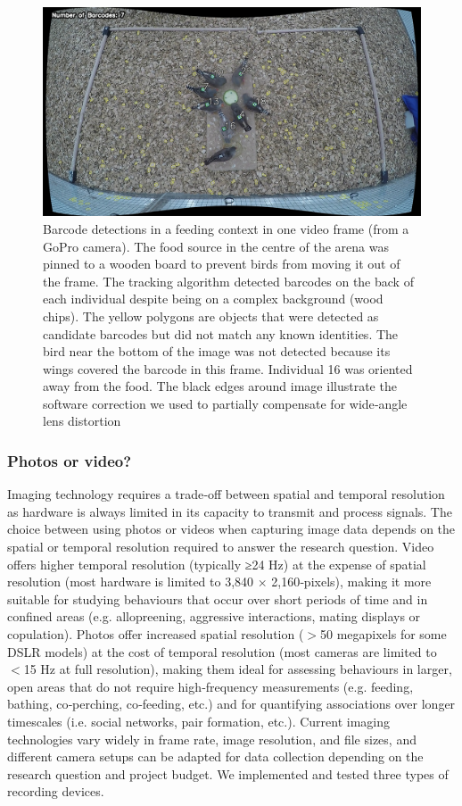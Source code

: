 \documentclass[11pt,a4paper,oneside]{book}
\begin{document}
\begin{doublespace}
\begin{figure}[!htb]
    \centering
    \includegraphics{Graving_IMPRS_Thesis/figures/bird_figure_3.jpg}
    \caption{Barcode detections in a feeding context in one video frame (from a GoPro camera). The food source in the centre of the arena was pinned to a wooden board to prevent birds from moving it out of the frame. The tracking algorithm detected barcodes on the back of each individual despite being on a complex background (wood chips). The yellow polygons are objects that were detected as candidate barcodes but did not match any known identities. The bird near the bottom of the image was not detected because its wings covered the barcode in this frame. Individual 16 was oriented away from the food. The black edges around image illustrate the software correction we used to partially compensate for wide‐angle lens distortion
}
    \label{fig:bird_figure_3}
\end{figure}

\subsubsection{Photos or video?}
Imaging technology requires a trade‐off between spatial and temporal resolution as hardware is always limited in its capacity to transmit and process signals. The choice between using photos or videos when capturing image data depends on the spatial or temporal resolution required to answer the research question. Video offers higher temporal resolution (typically ≥24 Hz) at the expense of spatial resolution (most hardware is limited to 3,840 $\times$ 2,160‐pixels), making it more suitable for studying behaviours that occur over short periods of time and in confined areas (e.g. allopreening, aggressive interactions, mating displays or copulation). Photos offer increased spatial resolution ($>$50 megapixels for some DSLR models) at the cost of temporal resolution (most cameras are limited to $<$15 Hz at full resolution), making them ideal for assessing behaviours in larger, open areas that do not require high‐frequency measurements (e.g. feeding, bathing, co‐perching, co‐feeding, etc.) and for quantifying associations over longer timescales (i.e. social networks, pair formation, etc.). Current imaging technologies vary widely in frame rate, image resolution, and file sizes, and different camera setups can be adapted for data collection depending on the research question and project budget. We implemented and tested three types of recording devices.


\end{doublespace}
\end{document}
